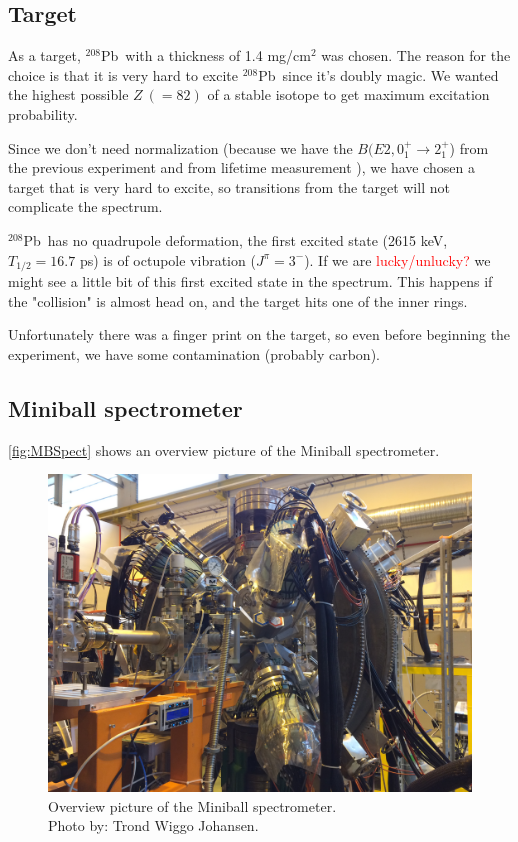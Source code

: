 \documentclass[twoside,english]{uiofysmaster/uiofysmaster}
\newcommand{\Pb}{$^{208}$Pb}
\begin{document}
\subsection{Target}
As a target, \Pb\ with a thickness of 1.4 mg/cm$^2$ was chosen. The reason for the choice is that it is very hard to excite \Pb\ since it's doubly magic. We wanted the highest possible $Z ~(= 82)$ of a stable isotope to get maximum excitation probability. 

Since we don't need normalization (because we have the $B(E2, 0_1^+ \rightarrow 2_1^+$) from the previous experiment \cite{Klintefjord2016} and from lifetime measurement \cite{BelloGarrote2015}), we have chosen a target that is very hard to excite, so transitions from the target will not complicate the spectrum.

\Pb\ has no quadrupole deformation, the first excited state (2615 keV, $T_{1/2} = 16.7$ ps) is of octupole vibration ($J^\pi = 3^-$). If we are \textcolor{red}{lucky/unlucky?} we might see a little bit of this first excited state in the spectrum. This happens if the "collision" is almost head on, and the target hits one of the inner rings.

Unfortunately there was a finger print on the target, so even before beginning the experiment, we have some contamination (probably carbon).


\subsection{Miniball spectrometer}
\autoref{fig:MBSpect} shows an overview picture of the Miniball spectrometer. 

\begin{figure}[ht]
	\centering
	\includegraphics[width=\linewidth]{Images/IMG3849.JPG}
	\caption{Overview picture of the Miniball spectrometer. \\ Photo by: Trond Wiggo Johansen.}
	\label{fig:MBSpect}
\end{figure}
\end{document}
